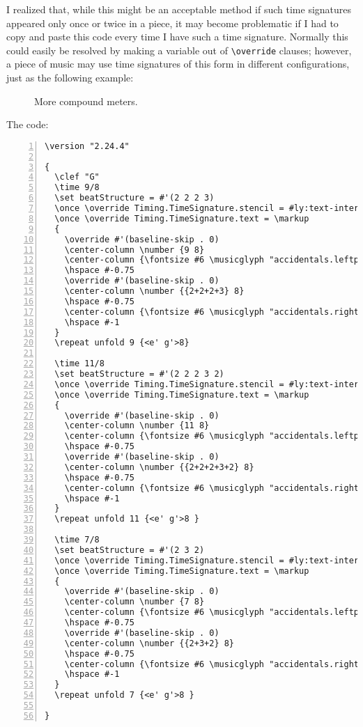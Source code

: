 I realized that, while this might be an acceptable method if such time signatures appeared only once or twice in a piece, it may become problematic if I had to copy and paste this code every time I have such a time signature. Normally this could easily be resolved by making a variable out of \verb|\override| clauses; however, a piece of music may use time signatures of this form in different configurations, just as the following example:

	\begin{figure}[!htb]
	\centering
{}
\label{sec:schemeExample1}
	\caption{\label{fig:figure6} More compound meters.}
	\end{figure}
	
The code:
\begin{Verbatim}[numbers=left,xleftmargin=5mm]
\version "2.24.4"

{
  \clef "G"
  \time 9/8
  \set beatStructure = #'(2 2 2 3)
  \once \override Timing.TimeSignature.stencil = #ly:text-interface::print
  \once \override Timing.TimeSignature.text = \markup
  {
    \override #'(baseline-skip . 0)
    \center-column \number {9 8}
    \center-column {\fontsize #6 \musicglyph "accidentals.leftparen"}
    \hspace #-0.75
    \override #'(baseline-skip . 0)
    \center-column \number {{2+2+2+3} 8}
    \hspace #-0.75
    \center-column {\fontsize #6 \musicglyph "accidentals.rightparen"}
    \hspace #-1
  }
  \repeat unfold 9 {<e' g'>8}

  \time 11/8
  \set beatStructure = #'(2 2 2 3 2)
  \once \override Timing.TimeSignature.stencil = #ly:text-interface::print
  \once \override Timing.TimeSignature.text = \markup
  {
    \override #'(baseline-skip . 0)
    \center-column \number {11 8}
    \center-column {\fontsize #6 \musicglyph "accidentals.leftparen"}
    \hspace #-0.75
    \override #'(baseline-skip . 0)
    \center-column \number {{2+2+2+3+2} 8}
    \hspace #-0.75
    \center-column {\fontsize #6 \musicglyph "accidentals.rightparen"}
    \hspace #-1
  }
  \repeat unfold 11 {<e' g'>8 }

  \time 7/8
  \set beatStructure = #'(2 3 2)
  \once \override Timing.TimeSignature.stencil = #ly:text-interface::print
  \once \override Timing.TimeSignature.text = \markup
  {
    \override #'(baseline-skip . 0)
    \center-column \number {7 8}
    \center-column {\fontsize #6 \musicglyph "accidentals.leftparen"}
    \hspace #-0.75
    \override #'(baseline-skip . 0)
    \center-column \number {{2+3+2} 8}
    \hspace #-0.75
    \center-column {\fontsize #6 \musicglyph "accidentals.rightparen"}
    \hspace #-1
  }
  \repeat unfold 7 {<e' g'>8 }

}
\end{Verbatim}

